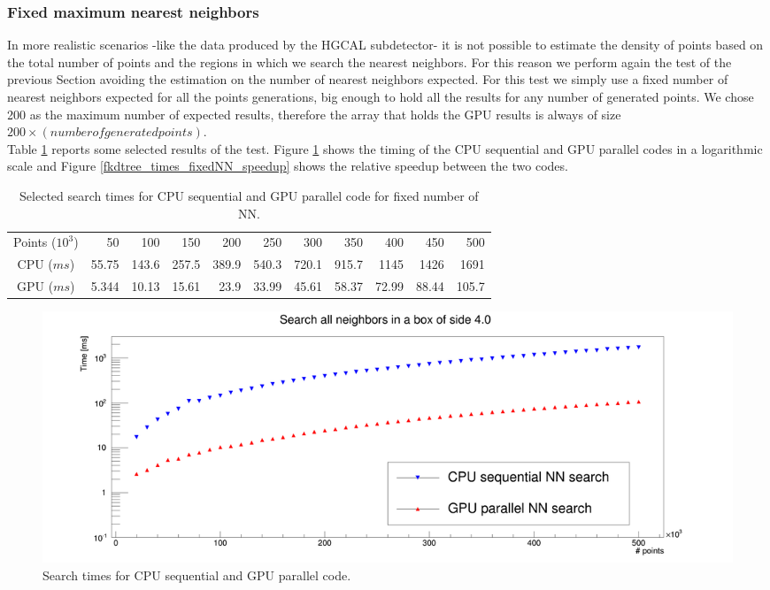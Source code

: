 \subsubsection{Fixed maximum nearest neighbors}
In more realistic scenarios -like the data produced by the HGCAL subdetector- it is not possible to estimate the density of points based on the total number of points and the regions in which we search the nearest neighbors. For this reason we perform again the test of the previous Section avoiding the estimation on the number of nearest neighbors expected. For this test we simply use a fixed number of nearest neighbors expected for all the points generations, big enough to hold all the results for any number of generated points. We chose 200 as the maximum number of expected results, therefore the array that holds the GPU results is always of size $200 \times (number of generated points)$.\\
Table \ref{fkdtree_times_fixedNN_tab} reports some selected results of the test. Figure \ref{fkdtree_times_fixedNN_searches} shows the timing of the CPU sequential and GPU parallel codes in a logarithmic scale and Figure \ref{fkdtree_times_fixedNN_speedup} shows the relative speedup between the two codes.\\

\begin{center}
\begin{table}[h]
\begin{tabular}{ c || r r r r r r r r r r }
Points ($10^{3}$) & 50 & 100 & 150 & 200 & 250 & 300 & 350 & 400 & 450 & 500 \\
CPU ($\unit{ms}$) & 55.75 & 143.6 & 257.5 & 389.9 & 540.3 & 720.1 & 915.7 & 1145 & 1426 & 1691 \\
GPU ($\unit{ms}$) & 5.344 & 10.13 & 15.61 & 23.9 & 33.99 & 45.61 & 58.37 & 72.99 & 88.44 & 105.7 \\
\end{tabular}
\caption{Selected search times for CPU sequential and GPU parallel code for fixed number of NN.}
\label{fkdtree_times_fixedNN_tab}
\end{table}
\end{center}

\begin{figure}
\includegraphics[width=\textwidth]{fkdtree/fixed200/fkdSearchTimes.png}
\caption{Search times for CPU sequential and GPU parallel code.}
\label{fkdtree_times_fixedNN_searches}
\end{figure}

